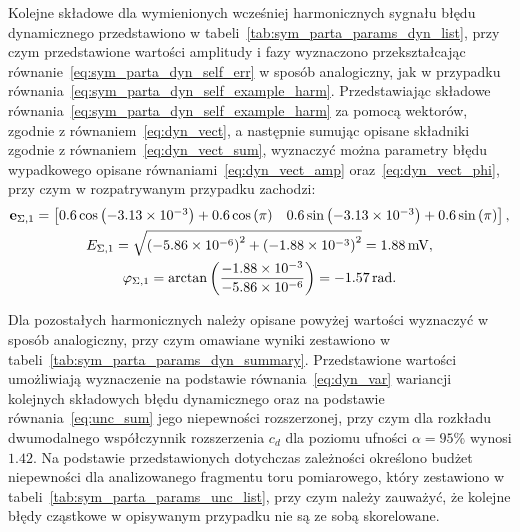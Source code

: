 Kolejne składowe dla wymienionych wcześniej harmonicznych sygnału błędu dynamicznego przedstawiono w tabeli~\ref{tab:sym_parta_params_dyn_list}, przy czym przedstawione wartości amplitudy i fazy wyznaczono przekształcając równanie~\eqref{eq:sym_parta_dyn_self_err} w sposób analogiczny, jak w przypadku równania~\eqref{eq:sym_parta_dyn_self_example_harm}. Przedstawiając składowe równania~\eqref{eq:sym_parta_dyn_self_example_harm} za pomocą wektorów, zgodnie z równaniem~\eqref{eq:dyn_vect}, a następnie sumując opisane składniki zgodnie z równaniem~\eqref{eq:dyn_vect_sum}, wyznaczyć można parametry błędu wypadkowego opisane równaniami~\eqref{eq:dyn_vect_amp} oraz~\eqref{eq:dyn_vect_phi}, przy czym w rozpatrywanym przypadku zachodzi:
\begin{gather}
\mathbf{e}_{\Sigma,1} =
\begin{bmatrix}
0.6 \cos \left(\num{-3.13e-3}\right) + 0.6 \cos \left(\pi\right) & 0.6 \sin \left(\num{-3.13e-3}\right) + 0.6 \sin \left(\pi\right)
\end{bmatrix}
\label{eq:sym_parta_dyn_self_example_sum}, \\
E_{\Sigma,1} = \sqrt{\left(\num{-5.86e-6}\right)^{2} + \left(\num{-1.88e-3}\right)^{2}} = \qty{1.88}{mV} \label{eq:sym_parta_dyn_self_example_amp}, \\
\varphi_{\Sigma,1} = \arctan \left(\frac{\num{-1.88e-3}}{\num{-5.86e-6}}\right) = \qty{-1.57}{rad} \label{eq:sym_parta_dyn_self_example_phi}.
\end{gather}

Dla pozostałych harmonicznych należy opisane powyżej wartości wyznaczyć w sposób analogiczny, przy czym omawiane wyniki zestawiono w tabeli~\ref{tab:sym_parta_params_dyn_summary}. Przedstawione wartości umożliwiają wyznaczenie na podstawie równania~\eqref{eq:dyn_var} wariancji kolejnych składowych błędu dynamicznego oraz na podstawie równania~\eqref{eq:unc_sum} jego niepewności rozszerzonej, przy czym dla rozkładu dwumodalnego współczynnik rozszerzenia $c_{d}$ dla poziomu ufności $\alpha = 95\%$ wynosi $1.42$. Na podstawie przedstawionych dotychczas zależności określono budżet niepewności dla analizowanego fragmentu toru pomiarowego, który zestawiono w tabeli~\ref{tab:sym_parta_params_unc_list}, przy czym należy zauważyć, że kolejne błędy cząstkowe w opisywanym przypadku nie są ze sobą skorelowane.

